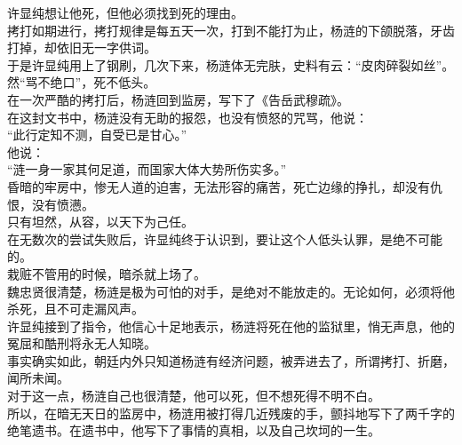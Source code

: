 \begin{multicols}{\theparacolNo}
许显纯想让他死，但他必须找到死的理由。\\

拷打如期进行，拷打规律是每五天一次，打到不能打为止，杨涟的下颌脱落，牙齿打掉，却依旧无一字供词。\\

于是许显纯用上了钢刷，几次下来，杨涟体无完肤，史料有云：“皮肉碎裂如丝”。\\

然“骂不绝口”，死不低头。\\

在一次严酷的拷打后，杨涟回到监房，写下了《告岳武穆疏》。\\

在这封文书中，杨涟没有无助的报怨，也没有愤怒的咒骂，他说：\\

“此行定知不测，自受已是甘心。”\\

他说：\\

“涟一身一家其何足道，而国家大体大势所伤实多。”\\

昏暗的牢房中，惨无人道的迫害，无法形容的痛苦，死亡边缘的挣扎，却没有仇恨，没有愤懑。\\

只有坦然，从容，以天下为己任。\\

在无数次的尝试失败后，许显纯终于认识到，要让这个人低头认罪，是绝不可能的。\\

栽赃不管用的时候，暗杀就上场了。\\

魏忠贤很清楚，杨涟是极为可怕的对手，是绝对不能放走的。无论如何，必须将他杀死，且不可走漏风声。\\

许显纯接到了指令，他信心十足地表示，杨涟将死在他的监狱里，悄无声息，他的冤屈和酷刑将永无人知晓。\\

事实确实如此，朝廷内外只知道杨涟有经济问题，被弄进去了，所谓拷打、折磨，闻所未闻。\\

对于这一点，杨涟自己也很清楚，他可以死，但不想死得不明不白。\\

所以，在暗无天日的监房中，杨涟用被打得几近残废的手，颤抖地写下了两千字的绝笔遗书。在遗书中，他写下了事情的真相，以及自己坎坷的一生。\\


\end{multicols}
